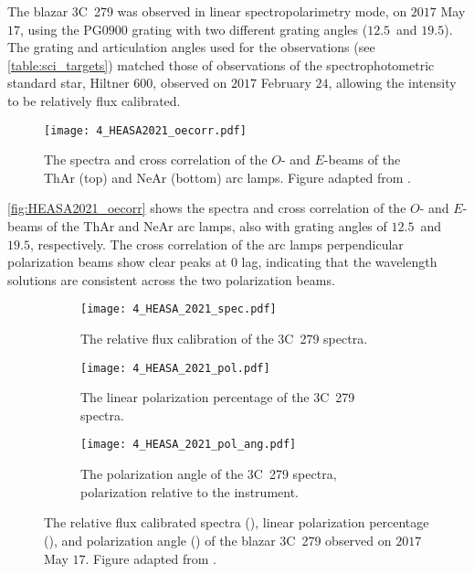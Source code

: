 The blazar 3C~279 was observed in linear spectropolarimetry mode, on $2017$ May $17$, using the PG$0900$ grating with two different grating angles ($12.5$\degree\ and $19.5$\degree).
The grating and articulation angles used for the observations (see \autoref{table:sci_targets}) matched those of observations of the spectrophotometric standard star, Hiltner $600$, observed on $2017$ February $24$, allowing the intensity to be relatively flux calibrated.

\begin{figure}[t]
    \centering
    \texttt{[image: 4\_HEASA2021\_oecorr.pdf]}
    \caption{
        The spectra and cross correlation of the $O$- and $E$-beams of the \gls{ThAr} (top) and \gls{NeAr} (bottom) arc lamps.
        Figure adapted from \citep{Cooper_HEASA2021}.
    }
    \label{fig:HEASA2021_oecorr}
\end{figure}

\autoref{fig:HEASA2021_oecorr} shows the spectra and cross correlation of the $O$- and $E$-beams of the \gls{ThAr} and \gls{NeAr} arc lamps, also with grating angles of $12.5$\degree\ and $19.5$\degree, respectively.
The cross correlation of the arc lamps perpendicular polarization beams show clear peaks at $0$ lag, indicating that the wavelength solutions are consistent across the two polarization beams.

\begin{figure}[t]
    \centering
    \begin{subfigure}[b]{1.0\textwidth}
        \centering
        \texttt{[image: 4\_HEASA\_2021\_spec.pdf]}
        \caption{The relative flux calibration of the 3C~279 spectra.}
        \label{subfig:HEASA2021_spec}
    \end{subfigure}
    \hfill
    \begin{subfigure}[b]{1.0\textwidth}
        \centering
        \texttt{[image: 4\_HEASA\_2021\_pol.pdf]}
        \caption{The linear polarization percentage of the 3C~279 spectra.}
        \label{subfig:HEASA2021_pol}
    \end{subfigure}
    \hfill
    \begin{subfigure}[b]{1.0\textwidth}
        \centering
        \texttt{[image: 4\_HEASA\_2021\_pol\_ang.pdf]}
        \caption{The polarization angle of the 3C~279 spectra, polarization relative to the instrument.}
        \label{subfig:HEASA2021_pol_ang}
    \end{subfigure}
    \caption{
        The relative flux calibrated spectra (), linear polarization percentage (), and polarization angle () of the blazar 3C~279 observed on $2017$ May $17$.
        Figure adapted from \cite{Cooper_HEASA2021}.
    }
    \label{fig:HEASA2021}
\end{figure}

